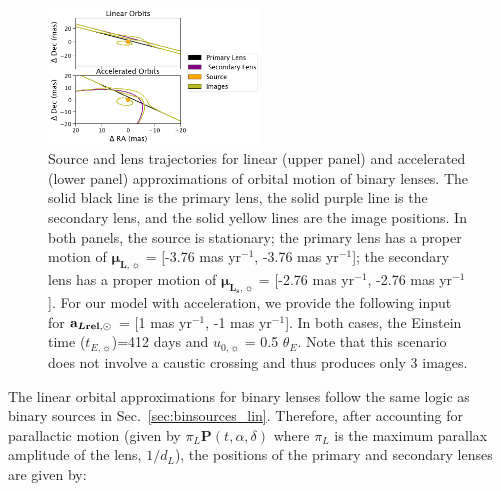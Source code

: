 \documentclass[twocolumn]{aastex701}
\newcommand{\vect}[1]{\boldsymbol{#1}}
\newcommand{\accLsec}{\bold{a}_{\boldsymbol{L\mathrm{rel}},\sun}}
\newcommand{\tnot}{t_{0,\sun}}
\newcommand{\tE}{t_{E,\sun}}
\newcommand{\thetaE}{\theta_E}
\newcommand{\uo}{u_{0,\sun}}
\newcommand{\mulvec}{\vect{\mu}_{\boldsymbol{L},\sun}}
\newcommand{\mulsvec}{\vect{\mu}_{\boldsymbol{L_s} ,\sun}}
\newcommand{\Xlpvec}{\vect{X}_{\boldsymbol{L_p},\sun}}
\newcommand{\Xlsvec}{\vect{X}_{\boldsymbol{L_s},\sun}}
\begin{document}
\begin{figure}
    \centering
    \includegraphics[width=0.5\textwidth]{figures/lin_lenses.png}
    \caption{Source and lens trajectories for linear (upper panel) and accelerated (lower panel) approximations of orbital motion of binary lenses. The solid black line is the primary lens, the solid purple line is the secondary lens, and the solid yellow lines are the image positions. In both panels, the source is stationary; the primary lens has a proper motion of $\mulvec$ = [-3.76 mas yr$^{-1}$, -3.76 mas yr$^{-1}$]; the secondary lens has a proper motion of  $\mulsvec$ = [-2.76 mas yr$^{-1}$, -2.76 mas yr$^{-1}$]. For our model with acceleration, we provide the following input for $\accLsec$ = [1 mas yr$^{-1}$, -1 mas yr$^{-1}$]. In both cases, the Einstein time ($\tE$)=412 days and $\uo$ = 0.5 $\thetaE$. Note that this scenario does not involve a caustic crossing and thus produces only 3 images.}
    \label{fig:psbl_linacc}
\end{figure}





The linear orbital approximations for binary lenses follow the same logic as binary sources in Sec.~\ref{sec:binsources_lin}. Therefore, after accounting for parallactic motion (given by $\pi_L
\vect{P}(t, \alpha, \delta)$ where $\pi_L$ is the
maximum parallax amplitude of the lens, $1/d_L$), the positions of the primary and secondary lenses are given by: 
\end{document}
